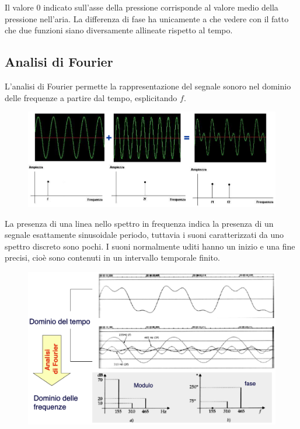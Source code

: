 Il valore 0 indicato sull'asse della pressione corrisponde al valore medio della pressione nell'aria. La differenza di fase ha unicamente a che vedere con il fatto che due funzioni siano diversamente allineate rispetto al tempo.

\subsection{Analisi di Fourier}
L'analisi di Fourier permette la rappresentazione del segnale sonoro nel dominio delle frequenze a partire dal tempo, esplicitando $f$.

\begin{figure}[h]
	\centering
	\includegraphics[scale=0.45]{Lezioni/Immagini/ondeverdi}
\end{figure}

La presenza di una linea nello spettro in frequenza indica la presenza di un segnale esattamente sinusoidale periodo, tuttavia i suoni caratterizzati da uno spettro discreto sono pochi. I suoni normalmente uditi hanno un inizio e una fine precisi, cioè sono contenuti in un intervallo temporale finito.

\begin{figure}[h]
	\centering
	\includegraphics[scale=0.4]{Lezioni/Immagini/ondestorte}
\end{figure}

